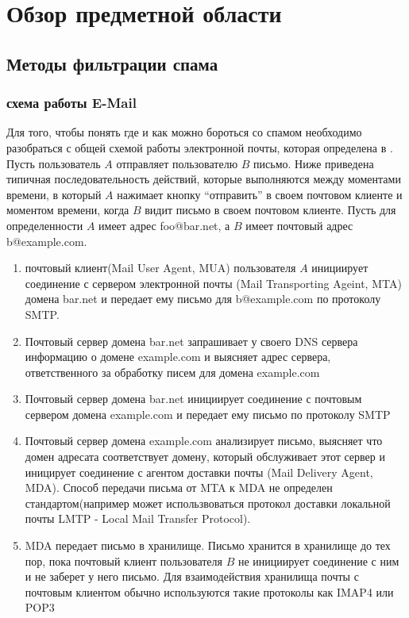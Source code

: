 \newpage
\section{Обзор предметной области}
\label{review}

\subsection{Методы фильтрации спама}
\subsubsection{схема работы E-Mail}
Для того, чтобы понять где и как можно бороться со спамом необходимо разобраться с общей схемой работы электронной почты, которая определена в \cite{RFC2081}. Пусть пользователь $A$ отправляет пользователю $B$ письмо. Ниже приведена типичная последовательность действий, которые выполняются между моментами времени, в который $A$ нажимает кнопку ``отправить'' в своем почтовом клиенте и моментом времени, когда $B$ видит письмо в своем почтовом клиенте. Пусть для определенности $A$ имеет адрес foo@bar.net, а $B$ имеет почтовый адрес b@example.com.

\begin{enumerate}
\item почтовый клиент(Mail User Agent, MUA) пользователя $A$ инициирует соединение с сервером электронной почты (Mail Transporting Ageint, MTA) домена bar.net и передает ему письмо для b@example.com по протоколу SMTP.
\item Почтовый сервер домена bar.net запрашивает у своего DNS сервера информацию о домене example.com и выясняет адрес сервера, ответственного за обработку писем для домена example.com
\item Почтовый сервер домена bar.net инициирует соединение с почтовым сервером домена example.com и передает ему письмо по протоколу SMTP
\item Почтовый сервер домена example.com анализирует письмо, выясняет что домен адресата соответствует домену, который обслуживает этот сервер и иницирует соединение с агентом доставки почты (Mail Delivery Agent, MDA). Способ передачи письма от MTA к MDA не определен стандартом(например может использвоваться протокол доставки локальной почты LMTP - Local Mail Transfer Protocol).
\item MDA передает письмо в хранилище. Письмо хранится в хранилище до тех пор, пока почтовый клиент пользователя $B$ не инициирует соединение с ним и не заберет у него письмо. Для взаимодействия хранилища почты с почтовым клиентом обычно используются такие протоколы как IMAP4 или POP3
\end{enumerate}

